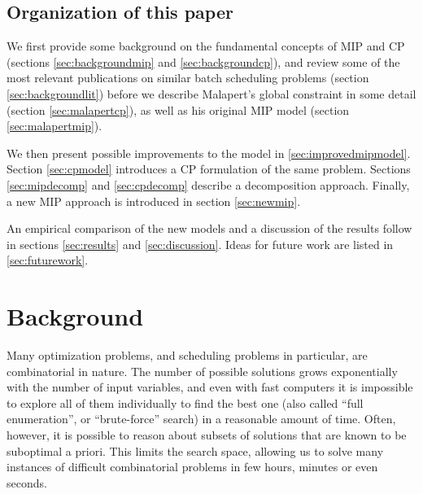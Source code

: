 \documentclass[13pt, letterpaper, oneside]{book}
\begin{document}

\section{Organization of this paper}
We first provide some background on the fundamental concepts of MIP and CP
(sections \ref{sec:backgroundmip} and \ref{sec:backgroundcp}), and
review some of the most relevant publications on similar batch scheduling
problems (section \ref{sec:backgroundlit}) before we describe Malapert's global
constraint in some detail (section \ref{sec:malapertcp}), as well as his
original MIP model (section \ref{sec:malapertmip}).

We then present possible improvements to the
model in \ref{sec:improvedmipmodel}. Section \ref{sec:cpmodel} introduces a CP
formulation of the same problem. Sections \ref{sec:mipdecomp} and
\ref{sec:cpdecomp} describe a decomposition approach. Finally, a new MIP approach
is introduced in section \ref{sec:newmip}.

An empirical comparison of the new models and a discussion of the results follow in
sections \ref{sec:results} and \ref{sec:discussion}. Ideas for future work are
listed in \ref{sec:futurework}.




\chapter{Background}
Many optimization problems, and scheduling problems in particular, are
combinatorial in nature. The number of possible solutions grows exponentially
with the number of input variables, and even with fast computers it is
impossible to explore all of them individually to find the best one
(also called ``full enumeration'', or ``brute-force'' search) in a reasonable
amount of time. Often, however, it is possible to reason about subsets of
solutions that are known to be suboptimal a priori. This limits the search
space, allowing us to solve many instances of difficult combinatorial problems
in few hours, minutes or even seconds.
\end{document}

